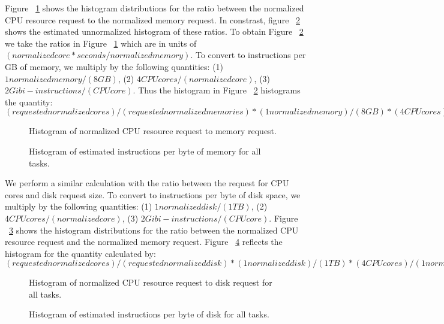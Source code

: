 \documentclass{sig-alternate}
\begin{document}
Figure ~\ref{req_cpu_mem} shows the histogram distributions for the ratio between the normalized CPU resource request to the normalized memory request. 
In constrast, figure ~\ref{est_req_cpu_mem} shows the estimated unnormalized histogram of these ratios. 
To obtain Figure ~\ref{est_req_cpu_mem} we take the ratios in Figure ~\ref{req_cpu_mem} which are in units of $(normalized core * seconds/normalized memory)$. 
To convert to instructions per GB of memory, we multiply by the following quantities: (1) $1 normalized memory/(8 GB)$, (2) $4 CPU cores/(normalized core)$, (3) $2 Gibi-instructions / (CPU core)$.  %
Thus the histogram in Figure ~\ref{est_req_cpu_mem} histograms the quantity:
$(requested normalized cores)/(requested normalized memories) * (1 normalized memory)/(8 GB) * (4 CPU cores)/(1 normalized core) * (2 G instructions)/(CPU core)$

\begin{figure}
\label{req_cpu_mem}
\caption{Histogram of normalized CPU resource request to memory request.}
\end{figure}

\begin{figure}
\label{est_req_cpu_mem}
\caption{Histogram of estimated instructions per byte of memory for all tasks.}
\end{figure}

We perform a similar calculation with the ratio between the request for CPU cores and disk request size.
To convert to instructions per byte of disk space, we multiply by the following quantities: (1) $1 normalized disk/(1 TB)$, (2) $4 CPU cores/(normalized core)$, (3) $2 Gibi-instructions/(CPU core)$.
Figure ~\ref{req_cpu_disk} shows the histogram distributions for the ratio between the normalized CPU resource request and the normalized memory request.
Figure ~\ref{est_req_cpu_disk} reflects the histogram for the quantity calculated by:
$(requested normalized cores)/(requested normalized disk) * (1 normalized disk)/(1 TB) * (4 CPU cores)/(1 normalized core) * (2 G instructions)/(CPU core)$

\begin{figure}
\label{req_cpu_disk}
\caption{Histogram of normalized CPU resource request to disk request for all tasks.}
\end{figure}

\begin{figure}
\label{est_req_cpu_disk}
\caption{Histogram of estimated instructions per byte of disk for all tasks.}
\end{figure}
\end{document}
